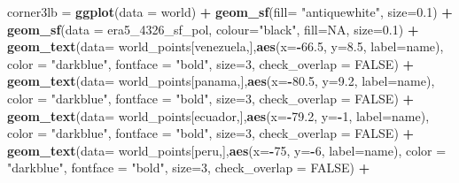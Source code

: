 \documentclass[12pt,oneside]{reedthesis}
\newenvironment{Shaded}{\begin{snugshade}}{\end{snugshade}}
\newcommand{\DataTypeTok}[1]{\textcolor[rgb]{0.13,0.29,0.53}{#1}}
\newcommand{\DecValTok}[1]{\textcolor[rgb]{0.00,0.00,0.81}{#1}}
\newcommand{\FloatTok}[1]{\textcolor[rgb]{0.00,0.00,0.81}{#1}}
\newcommand{\KeywordTok}[1]{\textcolor[rgb]{0.13,0.29,0.53}{\textbf{#1}}}
\newcommand{\NormalTok}[1]{#1}
\newcommand{\OperatorTok}[1]{\textcolor[rgb]{0.81,0.36,0.00}{\textbf{#1}}}
\newcommand{\OtherTok}[1]{\textcolor[rgb]{0.56,0.35,0.01}{#1}}
\newcommand{\StringTok}[1]{\textcolor[rgb]{0.31,0.60,0.02}{#1}}
\begin{document}
\begin{Shaded}
\begin{Highlighting}[]
\NormalTok{corner3lb =}\StringTok{ }\KeywordTok{ggplot}\NormalTok{(}\DataTypeTok{data =}\NormalTok{ world) }\OperatorTok{+}\StringTok{ }
\StringTok{  }\KeywordTok{geom_sf}\NormalTok{(}\DataTypeTok{fill=} \StringTok{"antiquewhite"}\NormalTok{,  }\DataTypeTok{size=}\FloatTok{0.1}\NormalTok{) }\OperatorTok{+}\StringTok{ }
\StringTok{  }\KeywordTok{geom_sf}\NormalTok{(}\DataTypeTok{data =}\NormalTok{ era5_}\DecValTok{4326}\NormalTok{_sf_pol, }\DataTypeTok{colour=}\StringTok{"black"}\NormalTok{, }\DataTypeTok{fill=}\OtherTok{NA}\NormalTok{, }\DataTypeTok{size=}\FloatTok{0.1}\NormalTok{) }\OperatorTok{+}\StringTok{ }
\StringTok{  }\KeywordTok{geom_text}\NormalTok{(}\DataTypeTok{data=}\NormalTok{ world_points[venezuela,],}\KeywordTok{aes}\NormalTok{(}\DataTypeTok{x=}\OperatorTok{-}\FloatTok{66.5}\NormalTok{, }\DataTypeTok{y=}\FloatTok{8.5}\NormalTok{, }\DataTypeTok{label=}\NormalTok{name), }\DataTypeTok{color =} \StringTok{"darkblue"}\NormalTok{, }\DataTypeTok{fontface =} \StringTok{"bold"}\NormalTok{, }\DataTypeTok{size=}\DecValTok{3}\NormalTok{, }\DataTypeTok{check_overlap =} \OtherTok{FALSE}\NormalTok{) }\OperatorTok{+}
\StringTok{  }\KeywordTok{geom_text}\NormalTok{(}\DataTypeTok{data=}\NormalTok{ world_points[panama,],}\KeywordTok{aes}\NormalTok{(}\DataTypeTok{x=}\OperatorTok{-}\FloatTok{80.5}\NormalTok{, }\DataTypeTok{y=}\FloatTok{9.2}\NormalTok{, }\DataTypeTok{label=}\NormalTok{name), }\DataTypeTok{color =} \StringTok{"darkblue"}\NormalTok{, }\DataTypeTok{fontface =} \StringTok{"bold"}\NormalTok{, }\DataTypeTok{size=}\DecValTok{3}\NormalTok{, }\DataTypeTok{check_overlap =} \OtherTok{FALSE}\NormalTok{) }\OperatorTok{+}\StringTok{ }
\StringTok{  }\KeywordTok{geom_text}\NormalTok{(}\DataTypeTok{data=}\NormalTok{ world_points[ecuador,],}\KeywordTok{aes}\NormalTok{(}\DataTypeTok{x=}\OperatorTok{-}\FloatTok{79.2}\NormalTok{, }\DataTypeTok{y=}\OperatorTok{-}\DecValTok{1}\NormalTok{, }\DataTypeTok{label=}\NormalTok{name), }\DataTypeTok{color =} \StringTok{"darkblue"}\NormalTok{, }\DataTypeTok{fontface =} \StringTok{"bold"}\NormalTok{, }\DataTypeTok{size=}\DecValTok{3}\NormalTok{, }\DataTypeTok{check_overlap =} \OtherTok{FALSE}\NormalTok{) }\OperatorTok{+}
\StringTok{  }\KeywordTok{geom_text}\NormalTok{(}\DataTypeTok{data=}\NormalTok{ world_points[peru,],}\KeywordTok{aes}\NormalTok{(}\DataTypeTok{x=}\OperatorTok{-}\DecValTok{75}\NormalTok{, }\DataTypeTok{y=}\OperatorTok{-}\DecValTok{6}\NormalTok{, }\DataTypeTok{label=}\NormalTok{name), }\DataTypeTok{color =} \StringTok{"darkblue"}\NormalTok{, }\DataTypeTok{fontface =} \StringTok{"bold"}\NormalTok{, }\DataTypeTok{size=}\DecValTok{3}\NormalTok{, }\DataTypeTok{check_overlap =} \OtherTok{FALSE}\NormalTok{) }\OperatorTok{+}

\end{Highlighting}
\end{Shaded}
\end{document}
